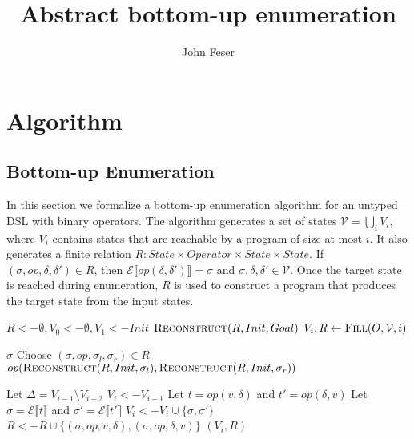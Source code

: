 \documentclass[review]{acmart}
\author{John Feser}
\title{Abstract bottom-up enumeration}
\renewcommand{\eval}[1]{\ensuremath{\mathcal{E}\llbracket#1\rrbracket}}
\begin{document}
\section{Algorithm}
\subsection{Bottom-up Enumeration}

In this section we formalize a bottom-up enumeration algorithm for an untyped
DSL with binary operators. The algorithm generates a set of states $\mathcal{V}
= \bigcup_i V_i$, where $V_i$ contains states that are reachable by a program of
size at most $i$. It also generates a finite relation $R : State \times Operator
\times State \times State$. If $(\sigma, op, \delta, \delta') \in R$, then
$\eval{op(\delta, \delta')} = \sigma$ and $\sigma, \delta, \delta' \in
\mathcal{V}$. Once the target state is reached during enumeration, $R$ is used
to construct a program that produces the target state from the input states.

\begin{algorithm}
  \begin{algorithmic}[1]
    \State $R <- \emptyset, V_0 <- \emptyset, V_1 <- Init$
    \State \Return $\Call{Reconstruct}{R, Init, Goal}$
    \EndIf
    \State $V_i, R <- \Call{Fill}{O, \mathcal{V}, i}$
    \EndFor
    \EndFunction
  \end{algorithmic}
\end{algorithm}

\begin{algorithm}
  \begin{algorithmic}[1]
    \State \Return $\sigma$
    \EndIf
    \State Choose $(\sigma, op, \sigma_l, \sigma_r) \in R$
    \State \Return $op(\Call{Reconstruct}{R, Init, \sigma_l},
    \Call{Reconstruct}{R, Init, \sigma_r})$
    \EndFunction
  \end{algorithmic}

  \begin{algorithmic}[1]
    \State Let $\Delta = V_{i - 1} \setminus V_{i - 2}$
    \State $V_i <- V_{i - 1}$
    \State Let $t = op(v, \delta)$ and $t' = op(\delta, v)$
    \State Let $\sigma = \eval{t}$ and $\sigma' = \eval{t'}$
    \State $V_i <- V_i \cup \{\sigma, \sigma'\}$
    \State $R <- R \cup \{(\sigma, op, v, \delta), (\sigma, op, \delta, v)\}$
    \EndFor
    \State \Return $(V_i, R)$
    \EndFunction
  \end{algorithmic}
\end{algorithm}
\end{document}
